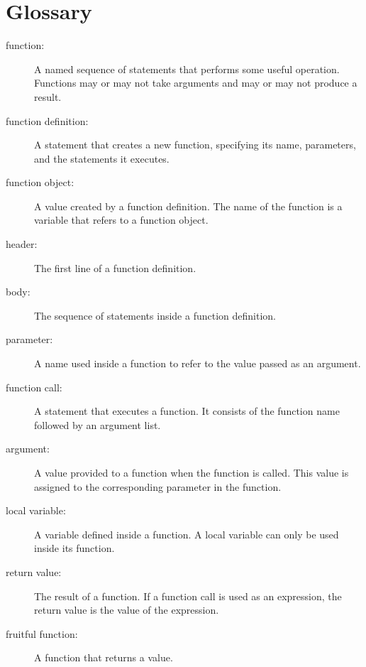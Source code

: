 \documentclass[10pt]{book}
\begin{document}
\section{Glossary}

\begin{description}

\item[function:] A named sequence of statements that performs some
useful operation.  Functions may or may not take arguments and may or
may not produce a result.

\item[function definition:]  A statement that creates a new function,
specifying its name, parameters, and the statements it executes.

\item[function object:]  A value created by a function definition.
The name of the function is a variable that refers to a function
object.

\item[header:] The first line of a function definition.

\item[body:] The sequence of statements inside a function definition.

\item[parameter:] A name used inside a function to refer to the value
passed as an argument.

\item[function call:] A statement that executes a function. It
consists of the function name followed by an argument list.

\item[argument:]  A value provided to a function when the function is called.
This value is assigned to the corresponding parameter in the function.

\item[local variable:]  A variable defined inside a function.  A local
variable can only be used inside its function.

\item[return value:]  The result of a function.  If a function call
is used as an expression, the return value is the value of
the expression.

\item[fruitful function:] A function that returns a value.


\end{description}
\end{document}
